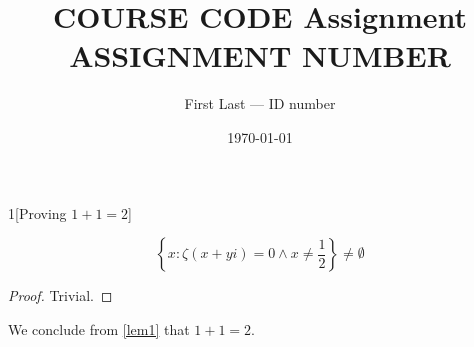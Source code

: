 \documentclass[a4paper,12pt]{article}
\begin{document}
\author{First Last --- ID number}
\title{COURSE CODE Assignment ASSIGNMENT NUMBER}
\date{\today}
\maketitle
\newpage

\begin{question}{1}[Proving $1+1=2$]
	
	\begin{lem}
		\begin{equation*}
			\left\{x  : \zeta(x+yi) =0 \wedge x \neq \frac{1}{2}\right\} \neq \emptyset
		\end{equation*}\label{lem1}
	\end{lem}
	
	\begin{proof}
		Trivial.
	\end{proof}

	We conclude from \cref{lem1} that $1+1=2$.
	
\end{question}
\end{document}
